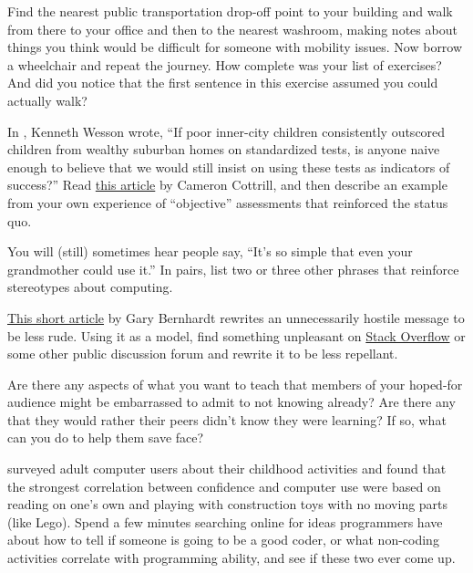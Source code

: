 Find the nearest public transportation drop-off point to your building
and walk from there to your office and then to the nearest washroom,
making notes about things you think would be difficult for someone with
mobility issues. Now borrow a wheelchair and repeat the journey. How
complete was your list of exercises? And did you notice that the first
sentence in this exercise assumed you could actually walk?


In \cite{Litt2004}, Kenneth Wesson wrote, ``If poor inner-city
children consistently outscored children from wealthy suburban homes
on standardized tests, is anyone naive enough to believe that we would
still insist on using these tests as indicators of success?'' Read
\href{https://mobile.nytimes.com/2016/04/10/upshot/why-talented-black-and-hispanic-students-can-go-undiscovered.html}{this
  article} by Cameron Cottrill, and then describe an example from your
own experience of ``objective'' assessments that reinforced the status
quo.


You will (still) sometimes hear people say, ``It's so simple that even
your grandmother could use it.'' In pairs, list two or three other
phrases that reinforce stereotypes about computing.


\href{https://www.destroyallsoftware.com/blog/2018/a-case-study-in-not-being-a-jerk-in-open-source}{This
  short article} by Gary Bernhardt rewrites an unnecessarily hostile
message to be less rude.  Using it as a model, find something
unpleasant on \href{http://stackoverflow.com}{Stack Overflow} or some
other public discussion forum and rewrite it to be less repellant.


Are there any aspects of what you want to teach that members of your
hoped-for audience might be embarrassed to admit to not knowing
already?  Are there any that they would rather their peers didn't know
they were learning?  If so, what can you do to help them save face?


\cite{Cutt2017} surveyed adult computer users about their childhood
activities and found that the strongest correlation between confidence
and computer use were based on reading on one's own and playing with
construction toys with no moving parts (like Lego).  Spend a few
minutes searching online for ideas programmers have about how to tell
if someone is going to be a good coder, or what non-coding activities
correlate with programming ability, and see if these two ever come up.

